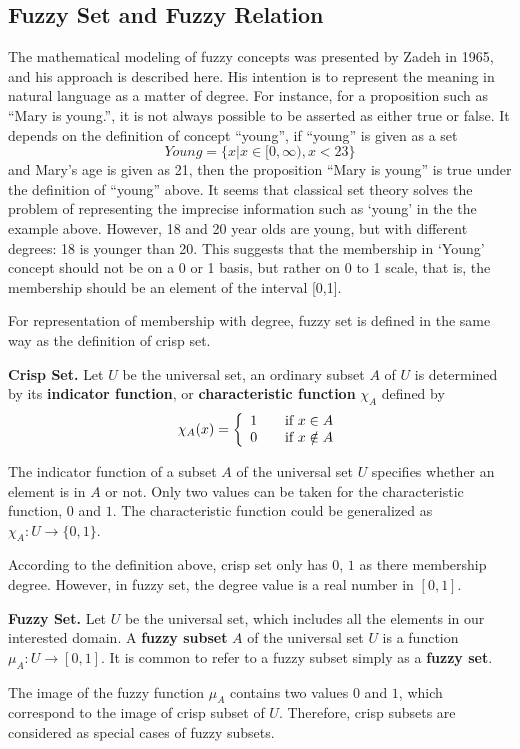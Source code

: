 \subsection{Fuzzy Set and Fuzzy Relation}
\label{sec:FSAFR}
The mathematical modeling of fuzzy concepts was presented by Zadeh in 1965, and his approach is described here. His intention is to represent the meaning in natural language as a matter of degree. For instance, for a proposition such as ``Mary is young.'', it is not always possible to be asserted as either true or false. It depends on the definition of concept ``young'', if ``young'' is given as a set
\[Young = \{x|x \in [0,\infty), x<23\}\]
and Mary's age is given as 21, then the proposition ``Mary is young'' is true under the definition of ``young'' above. It seems that classical set theory solves the problem of representing the imprecise information such as `young' in the the example above. However, 18 and 20 year olds are young, but with different degrees: 18 is younger than 20. This suggests that the membership in `Young' concept should not be on a 0 or 1 basis, but rather on 0 to 1 scale, that is, the membership should be an element of the interval [0,1].

For representation of membership with degree, fuzzy set is defined in the same way as the definition of crisp set.

\begin{defin} \textbf{Crisp Set.} 
\label{def:CrispSet}
Let $U$ be the universal set, an ordinary subset $A$ of $U$ is determined by its \textbf{indicator function}, or \textbf{characteristic function} $\chi_A$ defined by
\[
  \chi_A(x) = \left\{ 
  \begin{array}{l l}
    1 & \quad \text{if $x \in A$}\\
    0 & \quad \text{if $x \notin A$}\\
  \end{array} \right.
\]
\end{defin}
The indicator function of a subset $A$ of the universal set $U$ specifies whether an element is in $A$ or not. Only two values can be taken for the characteristic function, $0$ and $1$. The characteristic function could be generalized as $\chi_A : U \rightarrow \{0,1\}$.

According to the definition above, crisp set only has $0$, $1$ as there membership degree. However, in fuzzy set, the degree value is a real number in $[0,1]$.  

\begin{defin} \textbf{Fuzzy Set.}
\label{def:FuzzySet}
Let $U$ be the universal set, which includes all the elements in our interested domain. A \textbf{fuzzy subset} $A$ of the universal set $U$ is a function $\mu_A : U \rightarrow [0,1]$. It is common to refer to a fuzzy subset simply as a \textbf{fuzzy set}.

\end{defin} 
The image of the fuzzy function $\mu_A$ contains two values $0$ and $1$, which correspond to the image of crisp subset of $U$. Therefore, crisp subsets are considered as special cases of fuzzy subsets.

